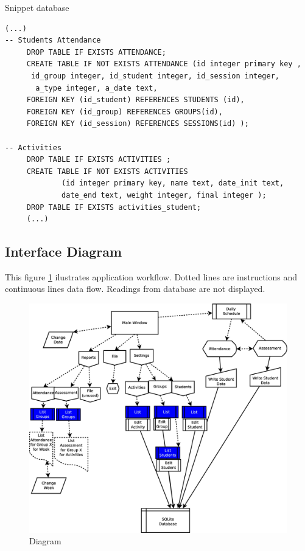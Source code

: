        
\begin{bclogo}[couleur=blue!30,arrondi=0.1,ombre=true ] 
{Snippet database}
\begin{verbatim}
(...)
-- Students Attendance
     DROP TABLE IF EXISTS ATTENDANCE;
     CREATE TABLE IF NOT EXISTS ATTENDANCE (id integer primary key ,
      id_group integer, id_student integer, id_session integer,
       a_type integer, a_date text,
     FOREIGN KEY (id_student) REFERENCES STUDENTS (id),
     FOREIGN KEY (id_group) REFERENCES GROUPS(id),
     FOREIGN KEY (id_session) REFERENCES SESSIONS(id) );

-- Activities
     DROP TABLE IF EXISTS ACTIVITIES ;
     CREATE TABLE IF NOT EXISTS ACTIVITIES
             (id integer primary key, name text, date_init text, 
             date_end text, weight integer, final integer );
     DROP TABLE IF EXISTS activities_student;
     (...)
\end{verbatim}
\end{bclogo}        
		\subsection{Interface Diagram}
		
		This figure \ref{fig:diagram} ilustrates application workflow. Dotted lines are instructions and continuous lines 
		data flow. Readings from database are not displayed. 
		
		\begin{figure}
		    \begin{center}
		        \includegraphics[scale=0.3]{eduxes_diagram.eps}
		        \caption{Diagram}
		        \label{fig:diagram}
		    \end{center}
		\end{figure}
		
